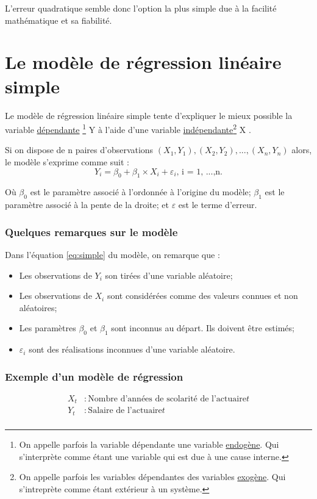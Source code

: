 \documentclass[11pt,french]{report}
\begin{document}
\bigskip
L'erreur quadratique semble donc l'option la plus simple due à la facilité mathématique et sa fiabilité.

\section{Le modèle de régression linéaire simple}
Le modèle de régression linéaire simple tente d'expliquer le mieux possible la variable \href{https://fr.wikipedia.org/wiki/Variable_dépendante}{dépendante} \footnote{On appelle parfois la variable dépendante une variable \href{https://fr.wikipedia.org/wiki/Endogène}{endogène}. Qui s'interprète comme étant une variable qui est due à une cause interne.}  Y à l'aide d'une variable \href{https://fr.wikipedia.org/wiki/Variable_indépendante}{indépendante}\footnote{On appelle parfois les variables dépendantes des variables \href{https://fr.wikipedia.org/wiki/Exogène}{exogène}. Qui s'intreprète comme étant extérieur à un système.} X . 

Si on dispose de n paires d'observations $(X_1, Y_1), (X_2, Y_2),...,(X_n, Y_n)$ alors, le modèle s'exprime  comme suit :
\begin{equation}
\label{eq:simple}
Y_i = \beta_0 + \beta_1\times X_i + \varepsilon_i \text{,  i = 1, ...,n.}
\end{equation}

Où $\beta_0$ est le paramètre associé à l'ordonnée à l'origine du modèle;
$\beta_1$ est le paramètre associé à la pente de la droite;
et $\varepsilon$ est le terme d'erreur.

\subsubsection*{Quelques remarques sur le modèle}
Dans l'équation \ref{eq:simple} du modèle, on remarque que :
\begin{itemize}
\item Les observations de $Y_i$ son tirées d'une variable aléatoire;
\item Les observations de $X_i$ sont considérées comme des valeurs connues et non aléatoires;
\item Les paramètres $\beta_0$ et $\beta_1$ sont inconnus au départ. Ils doivent être estimés;
\item $\varepsilon_i$ sont des réalisations inconnues d'une variable aléatoire.
\end{itemize}

\subsubsection*{Exemple d'un modèle de régression}
\begin{align*}
X_t &: \text{Nombre d'années de scolarité de l'actuaire} t \\
Y_t &: \text{Salaire de l'actuaire} t\\
\end{align*}
\end{document}
